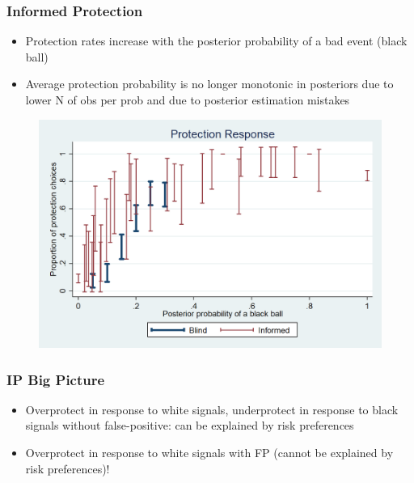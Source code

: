 \documentclass[11pt,hyperref={bookmarks=false}]{beamer}
\begin{document}
\begin{frame}
\frametitle{Informed Protection}
\begin{itemize}
\item Protection rates increase with the posterior probability of a bad event (black ball)
\item Average protection probability is no longer monotonic in posteriors due to lower N of obs per prob and due to posterior estimation mistakes 
\end{itemize}
\begin{figure}[h]
\includegraphics[scale=0.15]{Graphs/ip_response_comp.png}
\end{figure}
\end{frame}




\begin{frame}
\frametitle{IP Big Picture}
\begin{itemize}
\item Overprotect in response to white signals, underprotect in response to black signals without false-positive: can be explained by risk preferences
\item Overprotect in response to white signals with FP (cannot be explained by risk preferences)!
\end{itemize}
\scriptsize

\end{frame}
\end{document}
